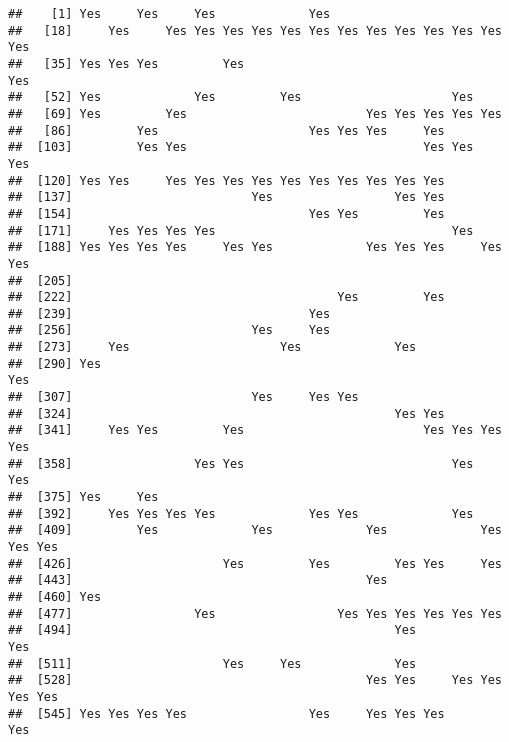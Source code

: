 \documentclass[]{article}
\begin{document}
\begin{verbatim}
##    [1] Yes     Yes     Yes             Yes                                
##   [18]     Yes     Yes Yes Yes Yes Yes Yes Yes Yes Yes Yes Yes Yes Yes    
##   [35] Yes Yes Yes         Yes                                         Yes
##   [52] Yes             Yes         Yes                     Yes            
##   [69] Yes         Yes                         Yes Yes Yes Yes Yes        
##   [86]         Yes                     Yes Yes Yes     Yes                
##  [103]         Yes Yes                                 Yes Yes         Yes
##  [120] Yes Yes     Yes Yes Yes Yes Yes Yes Yes Yes Yes Yes                
##  [137]                         Yes                 Yes Yes                
##  [154]                                 Yes Yes         Yes                
##  [171]     Yes Yes Yes Yes                                 Yes            
##  [188] Yes Yes Yes Yes     Yes Yes             Yes Yes Yes     Yes Yes    
##  [205]                                                                    
##  [222]                                     Yes         Yes                
##  [239]                                 Yes                                
##  [256]                         Yes     Yes                                
##  [273]     Yes                     Yes             Yes                    
##  [290] Yes                                                             Yes
##  [307]                         Yes     Yes Yes                            
##  [324]                                             Yes Yes                
##  [341]     Yes Yes         Yes                         Yes Yes Yes Yes    
##  [358]                 Yes Yes                             Yes     Yes    
##  [375] Yes     Yes                                                        
##  [392]     Yes Yes Yes Yes             Yes Yes             Yes            
##  [409]         Yes             Yes             Yes             Yes Yes Yes
##  [426]                     Yes         Yes         Yes Yes     Yes        
##  [443]                                         Yes                        
##  [460] Yes                                                                
##  [477]                 Yes                 Yes Yes Yes Yes Yes Yes        
##  [494]                                             Yes                 Yes
##  [511]                     Yes     Yes             Yes                    
##  [528]                                         Yes Yes     Yes Yes Yes Yes
##  [545] Yes Yes Yes Yes                 Yes     Yes Yes Yes             Yes

\end{verbatim}
\end{document}

